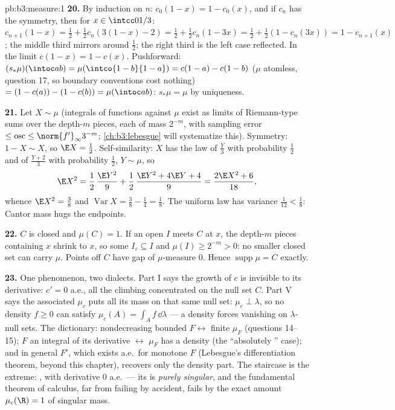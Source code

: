 \begin{solution}{pb:b3:measure:1}
\textbf{20.} By induction on $n$: $c_0(1-x) = 1 - c_0(x)$,
and if $c_n$ has the symmetry, then for $x \in
\intcc0{1/3}$: $c_{n+1}(1 - x) = \frac12 + \frac12c_n(3(1-x)
- 2) = \frac12 + \frac12c_n(1 - 3x) = \frac12 + \frac12(1 -
c_n(3x)) = 1 - c_{n+1}(x)$; the middle third mirrors around
$\frac12$; the right third is the left case reflected. In the
limit $c(1-x) = 1 - c(x)$. Pushforward: $(s_*\mu)(\intoc ab)
= \mu(\intco{1-b}{1-a}) = c(1-a) - c(1-b)$ ($\mu$ atomless,
question 17, so boundary conventions cost nothing) $= (1 -
c(a)) - (1 - c(b)) = \mu(\intoc ab)$: $s_*\mu = \mu$ by
uniqueness.

\textbf{21.} Let $X \sim \mu$ (integrals of 
functions against $\mu$ exist as limits of Riemann-type sums
over the depth-$m$ pieces, each of mass $2^{-m}$, with
sampling error $\leq \operatorname{osc} \leq
\norm{f'}_\infty3^{-m}$; \cref{ch:b3:lebesgue} will
systematize this). Symmetry: $1 - X \sim X$, so $\E X =
\frac12$. Self-similarity: $X$ has the law of $\frac Y3$ with
probability $\frac12$ and of $\frac{Y+2}3$ with probability
$\frac12$, $Y \sim \mu$, so
\[
\E X^2 = \frac12\,\frac{\E Y^2}9 + \frac12\,
\frac{\E Y^2 + 4\E Y + 4}{9} = \frac{2\E X^2 + 6}{18},
\]
whence $\E X^2 = \frac38$ and $\operatorname{Var}X = \frac38
- \frac14 = \frac18$. The uniform law has variance
$\frac1{12} < \frac18$: Cantor mass hugs the endpoints.

\textbf{22.} $C$ is closed and $\mu(C) = 1$. If an open $I$
meets $C$ at $x$, the depth-$m$ pieces containing $x$ shrink
to $x$, so some $I_\varepsilon \subseteq I$ and $\mu(I) \geq
2^{-m} > 0$: no smaller closed set can carry $\mu$. Points
off $C$ have gap  of $\mu$-measure $0$. Hence
$\operatorname{supp}\mu = C$ exactly.

\textbf{23.} One phenomenon, two dialects. Part I says the
growth of $c$ is invisible to its derivative: $c' = 0$ a.e.,
all the climbing concentrated on the null set $C$. Part V
says the associated  $\mu_c$ puts all its mass on that
same null set: $\mu_c \perp \lambda$, so no density $f \geq
0$ can satisfy $\mu_c(A) = \int_Af\,\dd\lambda$ --- a density
forces vanishing on $\lambda$-null sets. The dictionary:
nondecreasing bounded $F \leftrightarrow$ finite 
$\mu_F$ (questions 14--15); $F$ an integral of its derivative
$\leftrightarrow$ $\mu_F$ has a density (the ``absolutely
'' case); and in general $F'$, which exists a.e.\
for monotone $F$ (Lebesgue's differentiation theorem, beyond
this chapter), recovers only the density part. The staircase
is the extreme: , with derivative $0$ a.e.\ ---
its \omterm{def:b3:measure:measure}{measure} is \emph{purely singular}, and the fundamental
theorem of calculus, far from failing by accident, fails by
the exact amount $\mu_c(\R) = 1$ of singular mass.


\end{solution}
